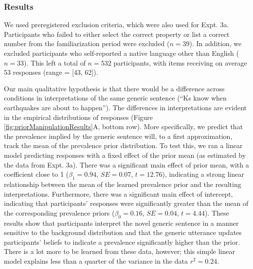 \documentclass[,man,floatsintext]{apa6}
\theoremstyle{definition}
\theoremstyle{definition}
\theoremstyle{definition}
\theoremstyle{remark}
\begin{document}
\hypertarget{results-4}{%
\subsubsection{Results}\label{results-4}}

We used preregistered exclusion criteria, which were also used for Expt.
3a. Participants who failed to either select the correct property or
list a correct number from the familiarization period were excluded
(\(n = 39\)). In addition, we excluded participants who self-reported a
native language other than English (\(n = 33\)). This left a total of
\(n = 532\) participants, with items receiving on average 53 responses
(range = {[}43, 62{]}).

Our main qualitative hypothesis is that there would be a difference
across conditions in interpretations of the same generic sentence
(\enquote{Ks know when earthquakes are about to happen}). The
differences in interpretations are evident in the empirical
distributions of responses (Figure \ref{fig:priorManipulationResults}A,
bottom row). More specifically, we predict that the prevalence implied
by the generic sentence will, to a first approximation, track the mean
of the prevalence prior distribution. To test this, we ran a linear
model predicting responses with a fixed effect of the prior mean (as
estimated by the data from Expt. 3a). There was a significant main
effect of prior mean, with a coefficient close to 1 (\(\beta_1 = 0.94\),
\(SE=0.07\), \(t = 12.76\)), indicating a strong linear relationship
between the mean of the learned prevalence prior and the resulting
interpretations. Furthermore, there was a significant main effect of
intercept, indicating that participants' responses were significantly
greater than the mean of the corresponding prevalence priors
(\(\beta_0 = 0.16\), \(SE=0.04\), \(t = 4.44\)). These results show that
participants interpret the novel generic sentence in a manner sensitive
to the background distribution and that the generic utterance updates
participants' beliefs to indicate a prevalence significantly higher than
the prior. There is a lot more to be learned from these data, however;
this simple linear model explains less than a quarter of the variance in
the data \(r^2 = 0.24\).
\end{document}
